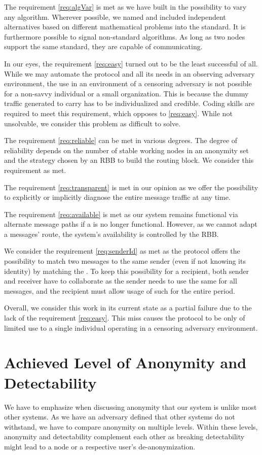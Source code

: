 The requirement \ref{req:algVar} is met as we have built in the possibility to vary any algorithm. Wherever possible, we named and included independent alternatives based on different mathematical problems into the standard. It is furthermore possible to signal non-standard algorithms. As long as two nodes support the same standard, they are capable of communicating.

In our eyes, the requirement \ref{req:easy} turned out to be the least successful of all. While we may automate the \MessageVortex{} protocol and all its needs in an observing adversary environment, the use in an environment of a censoring adversary is not possible for a non-savvy individual or a small organization. This is because the dummy traffic generated to carry \VortexMessages{} has to be individualized and credible. Coding skills are required to meet this requirement, which opposes to \ref{req:easy}. While not unsolvable, we consider this problem as difficult to solve.

The requirement \ref{req:reliable} can be met in various degrees. The degree of reliability depends on the number of stable working nodes in an anonymity set and the strategy chosen by an RBB to build the routing block. We consider this requirement as met. 

The requirement \ref{req:transparent} is met in our opinion as we offer the possibility to explicitly or implicitly diagnose the entire message traffic at any time. 

The requirement \ref{req:available} is met as our system remains functional via alternate message paths if a \VortexNode{} is no longer functional. However, as we cannot adapt a messages' route, the system's availability is controlled by the RBB.

We consider the requirement \ref{req:senderId} as met as the protocol offers the possibility to match two messages to the same sender (even if not knowing its identity) by matching the . To keep this possibility for a recipient, both sender and receiver have to collaborate as the sender needs to use the same  for all messages, and the recipient must allow usage of such  for the entire period.

Overall, we consider this work in its current state as a partial failure due to the lack of the requirement \ref{req:easy}. This miss causes the protocol to be only of limited use to a single individual operating in a censoring adversary environment.

\section{Achieved Level of Anonymity and Detectability}
We have to emphasize when discussing anonymity that our system is unlike most other systems. As we have an adversary defined that other systems do not withstand, we have to compare anonymity on multiple levels. Within these levels, anonymity and detectability complement each other as breaking detectability might lead to a node or a respective user's de-anonymization. 

